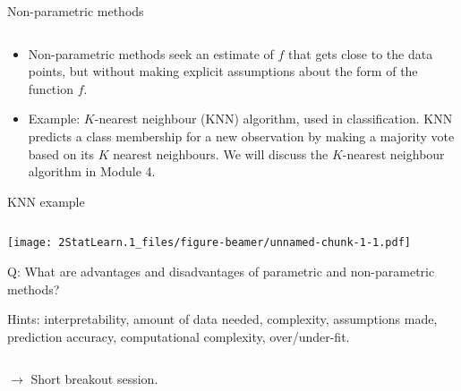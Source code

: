 \documentclass[ignorenonframetext,]{beamer}
\providecommand{\tightlist}{%
  \setlength{\itemsep}{0pt}\setlength{\parskip}{0pt}}
\begin{document}
\begin{frame}

\begin{block}{Non-parametric methods}

\(~\)

\begin{itemize}
\tightlist
\item
  Non-parametric methods seek an estimate of \(f\) that gets close to
  the data points, but without making explicit assumptions about the
  form of the function \(f\).
\end{itemize}

\vspace{2mm}

\begin{itemize}
\tightlist
\item
  Example: \(K\)-nearest neighbour (KNN) algorithm, used in
  classification. KNN predicts a class membership for a new observation
  by making a majority vote based on its \(K\) nearest neighbours. We
  will discuss the \(K\)-nearest neighbour algorithm in Module 4.
\end{itemize}

\end{block}

\end{frame}

\begin{frame}

\begin{block}{KNN example}

\(~\)

\texttt{[image: 2StatLearn.1\_files/figure-beamer/unnamed-chunk-1-1.pdf]}

\end{block}

\end{frame}

\begin{frame}

\begin{block}{Q: What are advantages and disadvantages of parametric and
non-parametric methods?}

\vspace{2mm}

Hints: interpretability, amount of data needed, complexity, assumptions
made, prediction accuracy, computational complexity, over/under-fit.

\(~\)

\(\rightarrow\) Short breakout session.

\end{block}

\end{frame}
\end{document}
